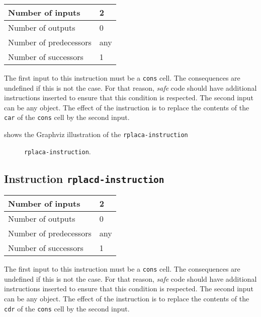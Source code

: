 \begin{tabular}{|l|l|}
\hline
Number of inputs & 2\\
\hline
Number of outputs & 0\\
\hline
Number of predecessors & any\\
\hline
Number of successors & 1\\
\hline
\end{tabular}

The first input to this instruction must be a \texttt{cons} cell.  The
consequences are undefined if this is not the case.  For that reason,
\emph{safe} code should have additional instructions inserted to
ensure that this condition is respected.  The second input can be any
object.  The effect of the instruction is to replace the contents of
the \texttt{car} of the \texttt{cons} cell by the second input.

 shows the Graphviz illustration of the
\texttt{rplaca-instruction}

\begin{figure}
\begin{center}
\end{center}
\caption{\label{fig-rplaca-instruction}
\texttt{rplaca-instruction}.}
\end{figure}

\subsection{Instruction \texttt{rplacd-instruction}}
\label{mir-instruction-rplacd}

\begin{tabular}{|l|l|}
\hline
Number of inputs & 2\\
\hline
Number of outputs & 0\\
\hline
Number of predecessors & any\\
\hline
Number of successors & 1\\
\hline
\end{tabular}

The first input to this instruction must be a \texttt{cons} cell.  The
consequences are undefined if this is not the case.  For that reason,
\emph{safe} code should have additional instructions inserted to
ensure that this condition is respected.  The second input can be any
object.  The effect of the instruction is to replace the contents of
the \texttt{cdr} of the \texttt{cons} cell by the second input.

